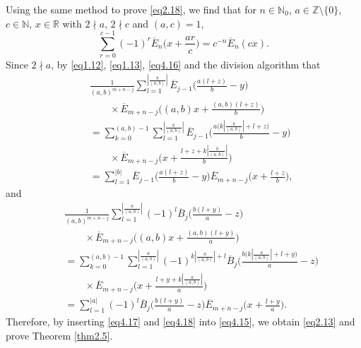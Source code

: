 \documentclass[reqno]{amsart}
\numberwithin{equation}{section}
\begin{document}
Using the same method to prove \eqref{eq2.18}, we find that for $n\in\mathbb{N}_{0}$, $a\in\mathbb{Z}\setminus\{0\}$, $c\in\mathbb{N}$, $x\in\mathbb{R}$ with $2\nmid a$, $2\nmid c$ and $(a,c)=1$,
\begin{equation}\label{eq4.16}
\sum_{r=0}^{c-1}(-1)^{r}\overline{E}_{n}\biggl(x+\frac{ar}{c}\biggl)
=c^{-n}\overline{E}_{n}(cx).
\end{equation}
Since $2\nmid a$, by \eqref{eq1.12}, \eqref{eq1.13}, \eqref{eq4.16} and the division algorithm that
\begin{eqnarray}\label{eq4.17}
&&\frac{1}{(a,b)^{m+n-j}}\sum_{l=1}^{|\frac{b}{(a,b)}|}
\overline{E}_{j-1}\biggl(\frac{a(l+z)}{b}-y\biggl)\nonumber\\
&&\qquad\times\overline{E}_{m+n-j}\biggl((a,b)x+\frac{(a,b)(l+z)}{b}\biggl)\nonumber\\
&&=\sum_{k=0}^{(a,b)-1}\sum_{l=1}^{|\frac{b}{(a,b)}|}\overline{E}_{j-1}\biggl(\frac{a\bigl(k|\frac{b}{(a,b)}|+l+z\bigl)}{b}-y\biggl)\nonumber\\
&&\qquad\times\overline{E}_{m+n-j}\biggl(x+\frac{l+z+k|\frac{b}{(a,b)}|}{b}\biggl)\nonumber\\
&&=\sum_{l=1}^{|b|}\overline{E}_{j-1}\biggl(\frac{a(l+z)}{b}-y\biggl)\overline{E}_{m+n-j}\biggl(x+\frac{l+z}{b}\biggl),
\end{eqnarray}
and
\begin{eqnarray}\label{eq4.18}
&&\frac{1}{(a,b)^{m+n-j}}\sum_{l=1}^{|\frac{a}{(a,b)}|}(-1)^{l}\overline{B}_{j}\biggl(\frac{b(l+y)}{a}-z\biggl)\nonumber\\
&&\qquad\times\overline{E}_{m+n-j}\biggl((a,b)x+\frac{(a,b)(l+y)}{a}\biggl)\nonumber\\
&&=\sum_{k=0}^{(a,b)-1}\sum_{l=1}^{|\frac{a}{(a,b)}|}(-1)^{k|\frac{a}{(a,b)}|+l}\overline{B}_{j}\biggl(\frac{b\bigl(k|\frac{a}{(a,b)}|+l+y\bigl)}{a}-z\biggl)\nonumber\\
&&\qquad\times\overline{E}_{m+n-j}\biggl(x+\frac{l+y+k|\frac{a}{(a,b)}|}{a}\biggl)\nonumber\\
&&=\sum_{l=1}^{|a|}(-1)^{l}\overline{B}_{j}\biggl(\frac{b(l+y)}{a}-z\biggl)\overline{E}_{m+n-j}\biggl(x+\frac{l+y}{a}\biggl).
\end{eqnarray}
Therefore, by inserting \eqref{eq4.17} and \eqref{eq4.18} into \eqref{eq4.15}, we obtain \eqref{eq2.13} and prove Theorem \ref{thm2.5}.
\end{document}
